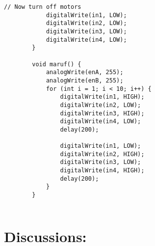 \documentclass[a4paper,12pt]{article}
\begin{document}
				
					\begin{lstlisting}[style=courier10, caption={Blink LED Code}]
			// Now turn off motors
			digitalWrite(in1, LOW);
			digitalWrite(in2, LOW);
			digitalWrite(in3, LOW);
			digitalWrite(in4, LOW);
		}
		
		void maruf() {
			analogWrite(enA, 255);
			analogWrite(enB, 255);
			for (int i = 1; i < 10; i++) {
				digitalWrite(in1, HIGH);
				digitalWrite(in2, LOW);
				digitalWrite(in3, HIGH);
				digitalWrite(in4, LOW);
				delay(200);
				
				digitalWrite(in1, LOW);
				digitalWrite(in2, HIGH);
				digitalWrite(in3, LOW);
				digitalWrite(in4, HIGH);
				delay(200);
			}
		}
		
	\end{lstlisting}
	
	\section*{Discussions:}
	
	
	
	
	
	
	
	
	
	
	
	
\end{document}
